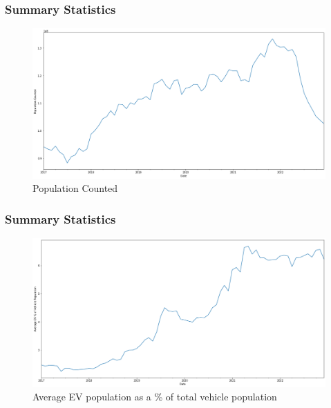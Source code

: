 \documentclass{beamer}
\begin{document}
\begin{frame}
\frametitle{Summary Statistics}

\begin{figure}[!htb]
  \includegraphics[width=\textwidth]{popcounted}
  \caption{Population Counted}
\end{figure}

\end{frame}

\begin{frame}
\frametitle{Summary Statistics}

\begin{figure}[!htb]
  \includegraphics[width=\textwidth]{evpop}
  \caption{Average EV population as a \% of total vehicle population}
\end{figure}

\end{frame}
\end{document}
